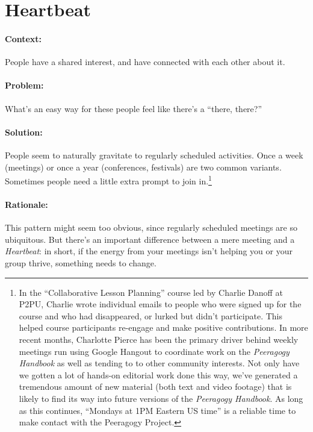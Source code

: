 \section{Heartbeat}

\paragraph{Context:}
People have a shared interest, and have connected with each other about it.

\paragraph{Problem:} What's an easy way for these people feel like there's a ``there, there?''

\paragraph{Solution:} People seem to naturally gravitate to regularly scheduled
activities. Once a week (meetings) or once a year (conferences, festivals) are two common variants.  Sometimes people need a little extra prompt to join in.\footnote{In the ``Collaborative Lesson Planning'' course led
by Charlie Danoff at P2PU, Charlie wrote individual emails to people who
were signed up for the course and who had disappeared, or lurked but
didn't participate. This helped course participants
re-engage and make positive contributions. In more recent
months, Charlotte Pierce has been the primary driver behind weekly meetings run using Google
Hangout to coordinate work on the \emph{Peeragogy Handbook} as well as tending to to other community interests. Not only have we
gotten a lot of hands-on editorial work done this way, we've generated a
tremendous amount of new material (both text and video footage) that is
likely to find its way into future versions of the \emph{Peeragogy Handbook}.  As long as this continues, ``Mondays at 1PM Eastern US time'' is a reliable time to make contact with the Peeragogy Project.}

\paragraph{Rationale:}  This pattern might seem too obvious, since regularly scheduled meetings are so ubiquitous.  But there's an important difference between a mere meeting and a \emph{Heartbeat}: in short, if the energy from your meetings isn't helping you or your group thrive, something needs to change.

